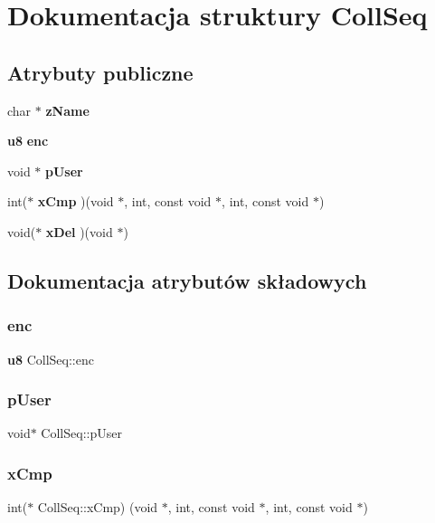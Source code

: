\section{Dokumentacja struktury Coll\+Seq}
\label{struct_coll_seq}
\subsection*{Atrybuty publiczne}
\begin{DoxyCompactItemize}
\item 
char $\ast$ \textbf{ z\+Name}
\item 
\textbf{ u8} \textbf{ enc}
\item 
void $\ast$ \textbf{ p\+User}
\item 
int($\ast$ \textbf{ x\+Cmp} )(void $\ast$, int, const void $\ast$, int, const void $\ast$)
\item 
void($\ast$ \textbf{ x\+Del} )(void $\ast$)
\end{DoxyCompactItemize}


\subsection{Dokumentacja atrybutów składowych}
\mbox{\label{struct_coll_seq_add27da1a70ed6f538447e9183eeb4838}} 
\subsubsection{enc}
{\footnotesize\ttfamily \textbf{ u8} Coll\+Seq\+::enc}

\mbox{\label{struct_coll_seq_a3cee924d41e730ccec7f686eb5b6f041}} 
\subsubsection{pUser}
{\footnotesize\ttfamily void$\ast$ Coll\+Seq\+::p\+User}

\mbox{\label{struct_coll_seq_a3f5a0c7eb4da9d8e396138719210f580}} 
\subsubsection{xCmp}
{\footnotesize\ttfamily int($\ast$ Coll\+Seq\+::x\+Cmp) (void $\ast$, int, const void $\ast$, int, const void $\ast$)}

